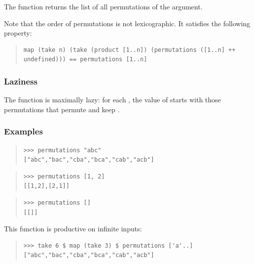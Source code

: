 \begin{haddockdesc}
\item[\begin{tabular}{@{}l}
permutations :: {\char 91}a{\char 93} -> {\char 91}{\char 91}a{\char 93}{\char 93}
\end{tabular}]
{\haddockbegindoc
The  function returns the list of all permutations of the argument.\par
Note that the order of permutations is not lexicographic.
 It satisfies the following property:\par
\begin{quote}
{\haddockverb\begin{verbatim}
map (take n) (take (product [1..n]) (permutations ([1..n] ++ undefined))) == permutations [1..n]\end{verbatim}}
\end{quote}
\subsubsection*{\textbf{Laziness}}
The  function is maximally lazy:
 for each , the value of  starts with those permutations
 that permute  and keep .\par
\subsubsection*{\textbf{Examples}}
\begin{quote}
{\haddockverb\begin{verbatim}
>>> permutations "abc"
["abc","bac","cba","bca","cab","acb"]

\end{verbatim}}
\end{quote}
\begin{quote}
{\haddockverb\begin{verbatim}
>>> permutations [1, 2]
[[1,2],[2,1]]

\end{verbatim}}
\end{quote}
\begin{quote}
{\haddockverb\begin{verbatim}
>>> permutations []
[[]]

\end{verbatim}}
\end{quote}
This function is productive on infinite inputs:\par
\begin{quote}
{\haddockverb\begin{verbatim}
>>> take 6 $ map (take 3) $ permutations ['a'..]
["abc","bac","cba","bca","cab","acb"]

\end{verbatim}}
\end{quote}}
\end{haddockdesc}
